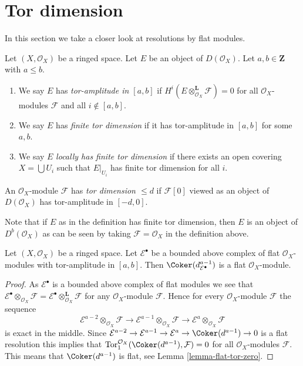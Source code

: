 \section{Tor dimension}
\label{section-tor}

\noindent
In this section we take a closer look at resolutions by flat modules.

\begin{definition}
\label{definition-tor-amplitude}
Let $(X, \mathcal{O}_X)$ be a ringed space.
Let $E$ be an object of $D(\mathcal{O}_X)$.
Let $a, b \in \mathbf{Z}$ with $a \leq b$.
\begin{enumerate}
\item We say $E$ has {\it tor-amplitude in $[a, b]$}
if $H^i(E \otimes_{\mathcal{O}_X}^\mathbf{L} \mathcal{F}) = 0$
for all $\mathcal{O}_X$-modules $\mathcal{F}$ and all $i \not \in [a, b]$.
\item We say $E$ has {\it finite tor dimension}
if it has tor-amplitude in $[a, b]$ for some $a, b$.
\item We say $E$ {\it locally has finite tor dimension}
if there exists an open covering $X = \bigcup U_i$ such that
$E|_{U_i}$ has finite tor dimension for all $i$.
\end{enumerate}
An $\mathcal{O}_X$-module $\mathcal{F}$ has {\it tor dimension $\leq d$}
if $\mathcal{F}[0]$ viewed as an object of $D(\mathcal{O}_X)$ has
tor-amplitude in $[-d, 0]$.
\end{definition}

\noindent
Note that if $E$ as in the definition
has finite tor dimension, then $E$ is an object of
$D^b(\mathcal{O}_X)$ as can be seen by taking $\mathcal{F} = \mathcal{O}_X$
in the definition above.

\begin{lemma}
\label{lemma-last-one-flat}
Let $(X, \mathcal{O}_X)$ be a ringed space.
Let $\mathcal{E}^\bullet$ be a bounded above complex of flat
$\mathcal{O}_X$-modules with tor-amplitude in $[a, b]$.
Then $\Coker(d_{\mathcal{E}^\bullet}^{a - 1})$ is a flat
$\mathcal{O}_X$-module.
\end{lemma}

\begin{proof}
As $\mathcal{E}^\bullet$ is a bounded above complex of flat modules we see that
$\mathcal{E}^\bullet \otimes_{\mathcal{O}_X} \mathcal{F} =
\mathcal{E}^\bullet \otimes_{\mathcal{O}_X}^{\mathbf{L}} \mathcal{F}$
for any $\mathcal{O}_X$-module $\mathcal{F}$.
Hence for every $\mathcal{O}_X$-module $\mathcal{F}$ the sequence
$$
\mathcal{E}^{a - 2} \otimes_{\mathcal{O}_X} \mathcal{F} \to
\mathcal{E}^{a - 1} \otimes_{\mathcal{O}_X} \mathcal{F} \to
\mathcal{E}^a \otimes_{\mathcal{O}_X} \mathcal{F}
$$
is exact in the middle. Since
$\mathcal{E}^{a - 2} \to \mathcal{E}^{a - 1} \to \mathcal{E}^a \to
\Coker(d^{a - 1}) \to 0$
is a flat resolution this implies that
$\text{Tor}_1^{\mathcal{O}_X}(\Coker(d^{a - 1}), \mathcal{F}) = 0$
for all $\mathcal{O}_X$-modules $\mathcal{F}$. This means that
$\Coker(d^{a - 1})$ is flat, see Lemma \ref{lemma-flat-tor-zero}.
\end{proof}

